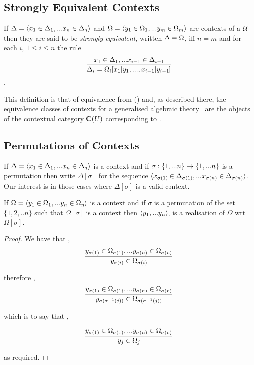 \documentclass[10pt,a4paper]{scrartcl}
\begin{document}
\subsection{Strongly Equivalent Contexts}
\begin{definition}
If  $\Delta= \langle x_1 \in \Delta_1,... x_{n} \in \Delta_{n}\rangle$ 
and $\Omega = \langle y_1 \in \Omega_1,... y_{m} \in \Omega_{m}\rangle$ are contexts of a \GAT $\mathcal{U}$ then they are said to be \textit{strongly equivalent}, written $\Delta \equiv \Omega$,  iff $n=m$ and for each $i$, $1 \leq i \leq n$ the rule 
$$
\frac{x_1 \in \Delta_1,... x_{i-1} \in \Delta_{i-1}}{\Delta_i=\Omega_i[x_1|y_1,...,x_{i-1}|y_{i-1}]}
$$
\intheory.
\end{definition}

This definition is that of equivalence from (\cite{Cartmell78})  and, as described there, the  equivalence classes of contexts for a generalised algebraic theory \gat\  are the objects of the contextual category $\mathbf{C}(U)$ corresponding to \gat.



\subsection{Permutations of Contexts}
If $\Delta = \langle x_1 \in \Delta_1,... x_{n} \in \Delta_{n}\rangle$ is a context and if $\sigma: \left\{1,...n\right\} \rightarrow \left\{1,...n\right\}$ is a permutation then write $\Delta[\sigma]$ for the
sequence $\langle x_{\sigma(1)} \in \Delta_{\sigma(1)},... x_{\sigma(n)} \in \Delta_{\sigma(n)}\rangle$. Our  interest is in those cases where $\Delta[\sigma]$ is a valid context.  
\begin{lemma}
If $\Omega = \langle y_1 \in \Omega_1,... y_{n} \in \Omega_{n}\rangle$ is a context and if $\sigma$ is a permutation of the set $\{1,2,..n\}$ such that $\Omega[\sigma]$ is a context then
$\langle y_1,...y_n\rangle$, is a realisation of $\Omega$ wrt $\Omega[\sigma]$.
\end{lemma}
\begin{proof}
We have that \foreachi,
\begin{equation*}
\frac{y_{\sigma(1)} \in \Omega_{\sigma(1)},... y_{\sigma(n)} \in \Omega_{\sigma(n)}}{y_{\sigma(i)} \in \Omega_{\sigma(i)}}
\end{equation*}

therefore \foreachj, 
\begin{equation*}
\frac
{y_{\sigma(1)} \in \Omega_{\sigma(1)},... y_{\sigma(n)} \in \Omega_{\sigma(n)}}     
        {y_{\sigma(\sigma^{-1}(j))} \in \Omega_{\sigma(\sigma^{-1}(j))}
				}
\end{equation*}

which is to say that \foreachj, 

\begin{equation*}
\frac{y_{\sigma(1)} \in \Omega_{\sigma(1)},... y_{\sigma(n)} \in \Omega_{\sigma(n)}}{y_j \in \Omega_{j}}
\end{equation*}

as required.
\end{proof}
\end{document}
